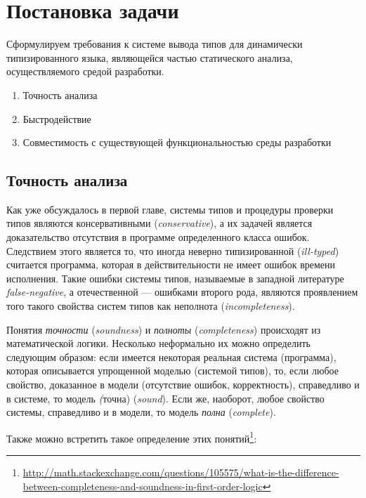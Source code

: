 \chapter{Постановка задачи}

Сформулируем требования к системе вывода типов для динамически
типизированного языка, являющейся частью статического анализа, осуществляемого
средой разработки.

\begin{enumerate}
    \item{Точность анализа}
    \item{Быстродействие}
    \item{Совместимость с существующей функциональностью среды разработки}
\end{enumerate}

\section{Точность анализа}
\label{sec:precision-requirement}

Как уже обсуждалось в первой главе, системы типов и процедуры проверки типов
являются консервативными (\emph{conservative}), а их задачей является
доказательство отсутствия в программе определенного класса ошибок. Следствием
этого является то, что иногда неверно типизированной (\emph{ill-typed})
считается программа, которая в действительности не имеет ошибок времени
исполнения. Такие ошибки системы типов, называемые в западной литературе
\emph{false-negative}, а отечественной --- ошибками второго рода, являются проявлением
того такого свойства систем типов как неполнота (\emph{incompleteness}). 

Понятия \emph{точности} (\emph{soundness}) и \emph{полноты}
(\emph{completeness}) происходят из математической логики. Несколько неформально
их можно определить следующим образом: если имеется некоторая реальная система
(программа), которая описывается упрощенной моделью (системой типов), то, если
любое свойство, доказанное в модели (отсутствие ошибок, корректность),
справедливо и в системе, то модель \emph(точна) (\emph{sound}).  Если же,
наоборот, любое свойство системы, справедливо и в модели, то модель \emph{полна}
(\emph{complete}).

Также можно встретить такое определение этих
понятий\footnote{\url{http://math.stackexchange.com/questions/105575/what-is-the-difference-between-completeness-and-soundness-in-first-order-logic}}:

